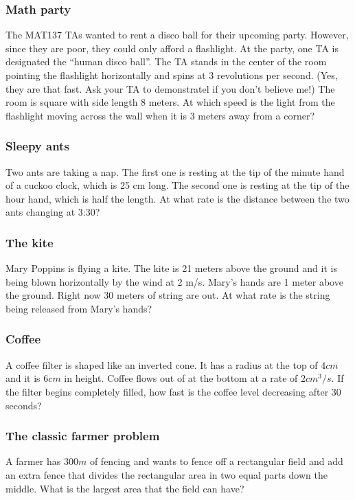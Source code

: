 \begin{frame}[t]
	\frametitle{Math party}

	The MAT137 TAs wanted to rent a disco ball for their upcoming party. However,
	since they are poor, they could only afford a flashlight. At the party, one TA
	is designated the ``human disco ball''. The TA stands in the center of the
	room pointing the flashlight horizontally and spins at 3 revolutions per
	second. (Yes, they are that fast. Ask your TA to demonstratel if you don't
	believe me!) The room is square with side length 8 meters. At which speed is the
	light from the flashlight moving across the wall when it is 3 meters away from
	a corner?
\end{frame}

\begin{frame}[t]
	\frametitle{Sleepy ants}

	Two ants are taking a nap. The first one is resting at the tip of the minute hand
	of a cuckoo clock, which is 25 cm long. The second one is resting at the tip of
	the hour hand, which is half the length. At what rate is the distance between the
	two ants changing at 3:30?
\end{frame}

\begin{frame}[t]
	\frametitle{The kite}

	Mary Poppins is flying a kite. The kite is 21 meters above the ground and it is
	being blown horizontally by the wind at 2 m/s. Mary's hands are 1 meter above
	the ground. Right now 30 meters of string are out. At what rate is the string
	being released from Mary's hands?
\end{frame}

\begin{frame}[t]
	\frametitle{Coffee}

	A coffee filter is shaped like an inverted cone. It has a radius at the top of
	$4cm$ and it is $6cm$ in height. Coffee flows out of at the bottom at a rate
	of $2cm^{3}/s$. If the filter begins completely filled, how fast is the coffee
	level decreasing after 30 seconds?
\end{frame}

\begin{frame}[t]
	\frametitle{The classic farmer problem}

	A farmer has $300m$ of fencing and wants to fence off a rectangular field and
	add an extra fence that divides the rectangular area in two equal parts down
	the middle. What is the largest area that the field can have?
\end{frame}

